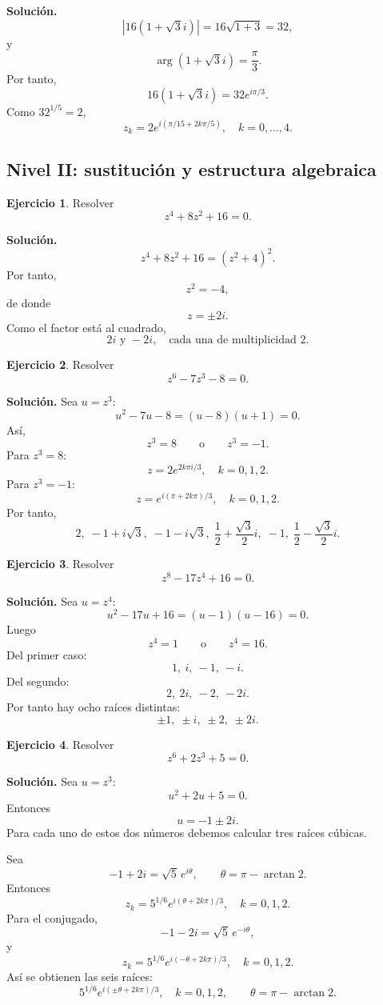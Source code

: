 \documentclass[12pt]{article}
\theoremstyle{definition}
\newtheorem{ejercicio}{Ejercicio}[section]
\theoremstyle{remark}
\begin{document}
\textbf{Solución.}
\[
|16(1+\sqrt3 i)|=16\sqrt{1+3}=32,
\]
y
\[
\arg(1+\sqrt3 i)=\frac{\pi}{3}.
\]
Por tanto,
\[
16(1+\sqrt3 i)=32e^{i\pi/3}.
\]
Como $32^{1/5}=2$,
\[
\boxed{
z_k=2e^{i(\pi/15+2k\pi/5)},\quad k=0,\ldots,4.
}
\]

\subsection{Nivel II: sustitución y estructura algebraica}

\begin{ejercicio}
Resolver
\[
z^4+8z^2+16=0.
\]
\end{ejercicio}

\textbf{Solución.}
\[
z^4+8z^2+16=(z^2+4)^2.
\]
Por tanto,
\[
z^2=-4,
\]
de donde
\[
z=\pm2i.
\]
Como el factor está al cuadrado,
\[
\boxed{2i\text{ y }-2i,\quad\text{cada una de multiplicidad }2.}
\]

\begin{ejercicio}
Resolver
\[
z^6-7z^3-8=0.
\]
\end{ejercicio}

\textbf{Solución.}
Sea $u=z^3$:
\[
u^2-7u-8=(u-8)(u+1)=0.
\]
Así,
\[
z^3=8\qquad\text{o}\qquad z^3=-1.
\]
Para $z^3=8$:
\[
z=2e^{2k\pi i/3},\quad k=0,1,2.
\]
Para $z^3=-1$:
\[
z=e^{i(\pi+2k\pi)/3},\quad k=0,1,2.
\]
Por tanto,
\[
\boxed{
2,\;-1+i\sqrt3,\;-1-i\sqrt3,\;
\frac12+\frac{\sqrt3}{2}i,\;-1,\;
\frac12-\frac{\sqrt3}{2}i.
}
\]

\begin{ejercicio}
Resolver
\[
z^8-17z^4+16=0.
\]
\end{ejercicio}

\textbf{Solución.}
Sea $u=z^4$:
\[
u^2-17u+16=(u-1)(u-16)=0.
\]
Luego
\[
z^4=1\qquad\text{o}\qquad z^4=16.
\]
Del primer caso:
\[
1,\ i,\ -1,\ -i.
\]
Del segundo:
\[
2,\ 2i,\ -2,\ -2i.
\]
Por tanto hay ocho raíces distintas:
\[
\boxed{\pm1,\;\pm i,\;\pm2,\;\pm2i.}
\]

\begin{ejercicio}
Resolver
\[
z^6+2z^3+5=0.
\]
\end{ejercicio}

\textbf{Solución.}
Sea $u=z^3$:
\[
u^2+2u+5=0.
\]
Entonces
\[
u=-1\pm2i.
\]
Para cada uno de estos dos números debemos calcular tres raíces cúbicas.

Sea
\[
-1+2i=\sqrt5\,e^{i\theta},
\qquad
\theta=\pi-\arctan 2.
\]
Entonces
\[
z_k=5^{1/6}e^{i(\theta+2k\pi)/3},
\quad k=0,1,2.
\]
Para el conjugado,
\[
-1-2i=\sqrt5\,e^{-i\theta},
\]
y
\[
z_k=5^{1/6}e^{i(-\theta+2k\pi)/3},
\quad k=0,1,2.
\]
Así se obtienen las seis raíces:
\[
\boxed{
5^{1/6}e^{i(\pm\theta+2k\pi)/3},
\quad k=0,1,2,\qquad
\theta=\pi-\arctan2.
}
\]
\end{document}

